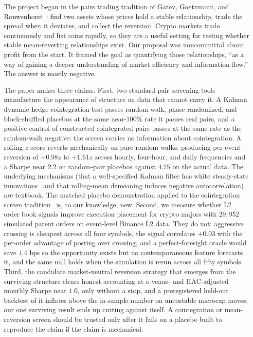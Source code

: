 \documentclass[11pt]{article}
\begin{document}
The project began in the pairs trading tradition of Gatev, Goetzmann, and
Rouwenhorst~\cite{gatev2006pairs}: find two assets whose prices hold a stable relationship, trade the
spread when it deviates, and collect the reversion. Crypto markets trade continuously and list
coins rapidly, so they are a useful setting for testing whether stable mean-reverting relationships
exist. Our proposal was noncommittal about profit from the start. It framed the goal as
quantifying those relationships, ``as a way of gaining a deeper understanding of market efficiency
and information flow.'' The answer is mostly negative.

The paper makes three claims. First, two standard pair screening tools manufacture the
appearance of structure on data that cannot carry it. A Kalman dynamic hedge cointegration test passes
random-walk, phase-randomized, and block-shuffled placebos at the same near-$100\%$ rate it
passes real pairs, and a positive control of constructed cointegrated pairs passes at the
same rate as the random-walk negative: the screen carries no information about
cointegration. A rolling $z$ score reverts mechanically on pure random walks, producing
per-event reversion of $+0.98z$ to $+1.61z$ across hourly, four-hour, and daily frequencies
and a Sharpe near $2.2$ on random-pair placebos against $4.75$ on the actual data. The
underlying mechanisms (that a well-specified Kalman filter has white steady-state
innovations~\cite{harvey1989structural} and that rolling-mean demeaning induces negative
autocorrelation) are textbook. The matched placebo demonstration applied to the
cointegration screen tradition~\cite{vidyamurthy2004pairs, elliott2005pairs,
triantafyllopoulos2011dynamic} is, to our knowledge, new. Second, we measure whether L2
order book signals improve execution placement for crypto majors with $29{,}952$ simulated
parent orders on event-level Binance L2 data. They do not: aggressive crossing is cheapest
across all four symbols, the signal correlates $+0.03$ with the per-order advantage of posting over crossing, and a perfect-foresight oracle would save $1.4$ bps so the opportunity exists
but no contemporaneous feature forecasts it, and the same null holds when the simulation is rerun across all fifty symbols. Third, the candidate market-neutral reversion
strategy that emerges from the surviving structure clears honest accounting at a venue- and
HAC-adjusted monthly Sharpe near $1.0$, only without a stop, and a preregistered held-out
backtest of it inflates above the in-sample number on uncostable microcap moves; our one
surviving result ends up cutting against itself. A cointegration or mean-reversion screen should
be trusted only after it fails on a placebo built to
reproduce the claim if the claim is mechanical.
\end{document}
